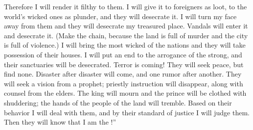 {Therefore
I will render
it filthy to them.
I will give
it to foreigners
as loot,
to the world’s
wicked
ones as plunder,
and they will desecrate it.
I will turn
my face
away from them and they
will desecrate
my treasured
place. Vandals
will enter
it and desecrate it.
(Make
the chain,
because
the land
is full
of murder
and the city
is full
of violence.)
I will bring
the most wicked
of the nations
and they will take possession
of their houses.
I will put an end
to the arrogance
of the strong, and their sanctuaries
will be
desecrated.
Terror
is coming! They will seek
peace,
but find none.
Disaster
after
disaster
will come,
and one rumor
after
another.
They will seek
a vision
from a prophet;
priestly
instruction
will disappear,
along with counsel
from the elders.
The king
will mourn
and the prince
will be clothed
with shuddering;
the hands
of the people
of the land
will tremble.
Based on their behavior
I will deal
with them, and by their standard of justice
I will judge
them. Then they will know
that
I
am the
{}!”

\par }
